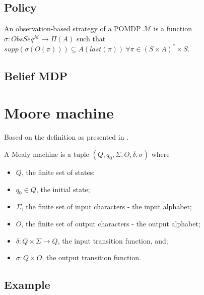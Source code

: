 \subsection*{Policy}
\begin{definition}
	An observation-based strategy of a POMDP $\mathcal{M}$ is a function $\sigma:ObsSeq^{\mathcal{M}}\to\Pi(A)$ such that $supp(\sigma(O(\pi)))\subseteq A (last(\pi))\ \forall \pi\in(S\times A)^*\times S$.
\end{definition}

\subsection*{Belief MDP}



\section{Moore machine}
Based on the definition as presented in \cite{p:moore}.
\begin{definition}
	A Mealy machine is a tuple $(Q,q_0,\Sigma,O,\delta,\sigma)$ where
	\begin{itemize}
		\item $Q$, the finite set of states;
		\item $q_0\in Q$, the initial state;
		\item $\Sigma$, the finite set of input characters - the input alphabet;
		\item $O$, the finite set of output characters - the output alphabet;
		\item $\delta: Q\times \Sigma\to Q$, the input transition function, and;
		\item $\sigma : Q\times O$, the output transition function.
	\end{itemize}
\end{definition}
\subsection*{Example}
